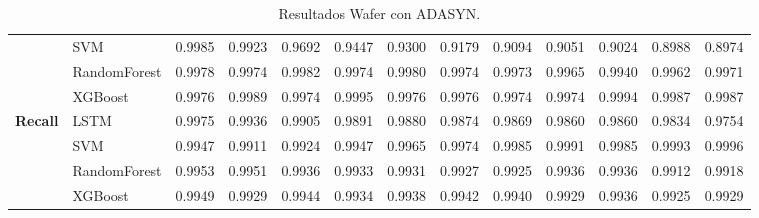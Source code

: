 \begin{table}[h]
\begin{adjustbox}{max width=15cm}
\begin{tabular}{|c|l|r|r|r|r|r|r|r|r|r|r|r|}
			& SVM &  0.9985 &  0.9923 &  0.9692 &  0.9447 &  0.9300 &  0.9179 &  0.9094 &  0.9051 &  0.9024 &  0.8988 &  0.8974 \\
			& RandomForest &  0.9978 &  0.9974 &  0.9982 &  0.9974 &  0.9980 &  0.9974 &  0.9973 &  0.9965 &  0.9940 &  0.9962 &  0.9971 \\
			& XGBoost &  0.9976 &  0.9989 &  0.9974 &  0.9995 &  0.9976 &  0.9976 &  0.9974 &  0.9974 &  0.9994 &  0.9987 &  0.9987 \\
			\hline
			\textbf{Recall} & LSTM &  0.9975 &  0.9936 &  0.9905 &  0.9891 &  0.9880 &  0.9874 &  0.9869 &  0.9860 &  0.9860 &  0.9834 &  0.9754 \\
			& SVM &  0.9947 &  0.9911 &  0.9924 &  0.9947 &  0.9965 &  0.9974 &  0.9985 &  0.9991 &  0.9985 &  0.9993 &  0.9996 \\
			& RandomForest &  0.9953 &  0.9951 &  0.9936 &  0.9933 &  0.9931 &  0.9927 &  0.9925 &  0.9936 &  0.9936 &  0.9912 &  0.9918 \\
			& XGBoost &  0.9949 &  0.9929 &  0.9944 &  0.9934 &  0.9938 &  0.9942 &  0.9940 &  0.9929 &  0.9936 &  0.9925 &  0.9929 \\
			\hline
		\end{tabular}
	\end{adjustbox}
	\caption{Resultados Wafer con ADASYN.}
	\label{tab:Wafer_ADASYN}
\end{table}
\newpage
